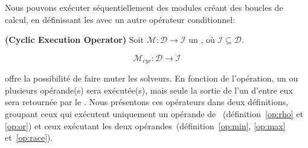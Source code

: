 Nous pouvons exécuter séquentiellement  des modules créant des boucles de calcul, en définissant les \cms{} avec un autre opérateur conditionnel:

\begin{definition}\label{op:cyclic}
{\bf (Cyclic Execution Operator)} Soit $\mathcal{M} : \mathcal{D} \rightarrow \mathcal{I}$ un \m, où $\mathcal{I} \subseteq \mathcal{D}$. 

\[
\mathcal{M}_{cyc}:\mathcal{D} \rightarrow \mathcal{I} 
\]
\end{definition}

%

%
%

\posl{} offre la possibilité de faire muter les solveurs. En fonction de l'opération, un  ou plusieurs \m{} opérande(s) sera exécutée(s), mais seule la sortie de l'un d'entre  eux sera retournée par le \cm. Nous présentons  ces opérateurs  dans deux  définitions, groupant  ceux qui exécutent uniquement un opérande  de \m{}~(définition~\ref{op:rho} et \ref{op:or}) et ceux exécutant les deux opérandes~(définition~\ref{op:min}, \ref{op:max} et~\ref{op:race}).

